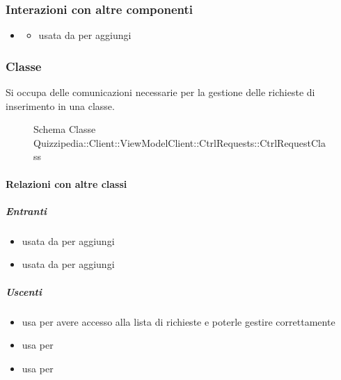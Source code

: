 \subsubsection{Interazioni con altre componenti}
\begin{itemize}
\item {}
\begin{itemize}
\item usata da  per aggiungi
\end{itemize}
\end{itemize}
\subsubsection{Classe }
Si occupa delle comunicazioni necessarie per la gestione delle richieste di inserimento in una classe.
\begin{figure}[H]
\centering
\noindent{}
\caption[Schema Classe CtrlRequestClass]{Schema Classe Quizzipedia::Client::ViewModelClient::CtrlRequests::CtrlRequestClass}
\end{figure}
\paragraph{Relazioni con altre classi}
\subparagraph{Entranti}
\begin{itemize}
\item usata da  per aggiungi
\item usata da  per aggiungi
\end{itemize}
\subparagraph{Uscenti}
\begin{itemize}
\item usa  per avere accesso alla lista di richieste e poterle gestire correttamente
\item usa  per 
\item usa  per 
\end{itemize}

